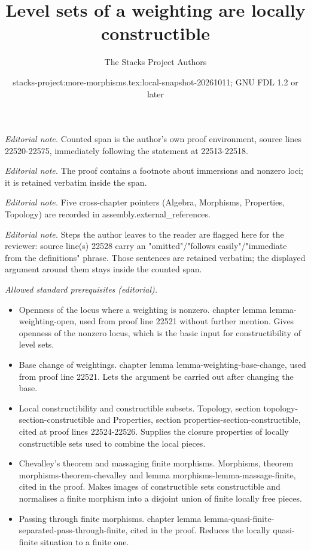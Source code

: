 \documentclass[10pt,a4paper]{amsart}
\title{Level sets of a weighting are locally constructible}
\author{The Stacks Project Authors}
\date{stacks-project:more-morphisms.tex:local-snapshot-20261011; GNU FDL 1.2 or later}
\theoremstyle{plain}
\theoremstyle{definition}
\theoremstyle{remark}
\numberwithin{equation}{subsection}
\begin{document}
\maketitle
\noindent\textit{Editorial note.} Counted span is the author's own proof environment, source lines 22520-22575, immediately following the statement at 22513-22518.\par\medskip
\noindent\textit{Editorial note.} The proof contains a footnote about immersions and nonzero loci; it is retained verbatim inside the span.\par\medskip
\noindent\textit{Editorial note.} Five cross-chapter pointers (Algebra, Morphisms, Properties, Topology) are recorded in assembly.external\_references.\par\medskip
\noindent\textit{Editorial note.} Steps the author leaves to the reader are flagged here for the reviewer: source line(s) 22528 carry an "omitted"/"follows easily"/"immediate from the definitions" phrase. Those sentences are retained verbatim; the displayed argument around them stays inside the counted span.\par\medskip
\noindent\textit{Allowed standard prerequisites (editorial).}\begin{itemize}
\item Openness of the locus where a weighting is nonzero. chapter lemma lemma-weighting-open, used from proof line 22521 without further mention. Gives openness of the nonzero locus, which is the basic input for constructibility of level sets.
\item Base change of weightings. chapter lemma lemma-weighting-base-change, used from proof line 22521. Lets the argument be carried out after changing the base.
\item Local constructibility and constructible subsets. Topology, section topology-section-constructible and Properties, section properties-section-constructible, cited at proof lines 22524-22526. Supplies the closure properties of locally constructible sets used to combine the local pieces.
\item Chevalley's theorem and massaging finite morphisms. Morphisms, theorem morphisms-theorem-chevalley and lemma morphisms-lemma-massage-finite, cited in the proof. Makes images of constructible sets constructible and normalises a finite morphism into a disjoint union of finite locally free pieces.
\item Passing through finite morphisms. chapter lemma lemma-quasi-finite-separated-pass-through-finite, cited in the proof. Reduces the locally quasi-finite situation to a finite one.
\end{itemize}\medskip
\end{document}
